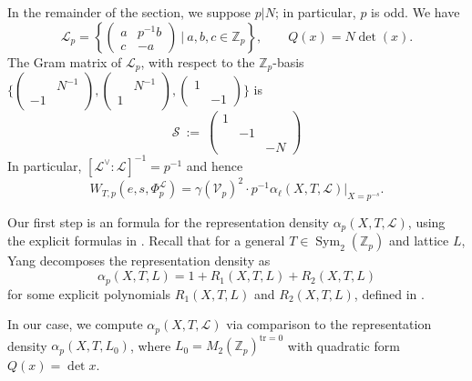 \documentclass[reqno,oneside]{amsart}
\theoremstyle{plain}
\theoremstyle{remark}
\numberwithin{theorem}{section}
\newcommand{\bbZ}{\mathbb Z}
\newcommand{\calL}{\mathcal L}
\newcommand{\calS}{\mathcal S}
\newcommand{\calV}{\mathcal V}
\newcommand{\psm}[1]{\left( \begin{smallmatrix}#1 \end{smallmatrix} \right)}
\DeclareMathOperator{\Sym}{Sym}
\newcommand{\Z}{\mathbb{Z}}
\begin{document}
	
	In the remainder of the section, we suppose $p | N$; in particular, $p$ is odd. We have
	\begin{equation}
	\calL_p =  \left\{ \begin{pmatrix} a & p^{-1 } b \\ c & -a \end{pmatrix} \ \Big| \ a,b,c \in \bbZ_p \right\}, \qquad Q(x) = N \det(x).
	\end{equation}
	The Gram matrix of $\calL_p$, with respect to the  $\bbZ_p$-basis $\{\psm{& N^{-1} \\ -1 &}, \psm{& N^{-1} \\ 1 &},  \psm{1 & \\ & -1}  \}$ is
	\begin{equation}
	\calS \ := \ \begin{pmatrix}1 & & \\ & -1 & \\ & &  -N \end{pmatrix}
	\end{equation}
	In particular, $[\calL^{\vee}:\calL]^{-1}= p^{-1}$ and hence
	\begin{equation}
	W_{T,p}(e, s, \Phi^{\calL}_p) = \gamma(\calV_p)^2 \cdot p^{-1} \alpha_{\ell}(X, T, \calL)\big|_{X =p^{-s}}.
	\end{equation}
	
	Our first step is an  formula for the representation density $\alpha_p(X, T, \calL)$, using the explicit formulas in \cite{YangLocal}. Recall that for a general $T \in \Sym_2(\bbZ_p)$ and lattice $L$, Yang decomposes the representation density as
	\begin{equation}
	\alpha_p(X, T, L) = 1 + R_1(X, T, L) + R_2(X, T, L)
	\end{equation}
	for some explicit polynomials $R_1(X, T, L)$ and $R_2(X, T, L)$, defined in \cite[\S 7]{YangLocal}.
	
	In our case, we compute $\alpha_p(X, T, \calL)$ via comparison to the representation density $\alpha_p(X, T, L_0)$, where $L_0 = M_2(\Z_p)^{\mathrm{tr} =0}$ with quadratic form
	$Q(x) =\det x$.
	
\end{document}
